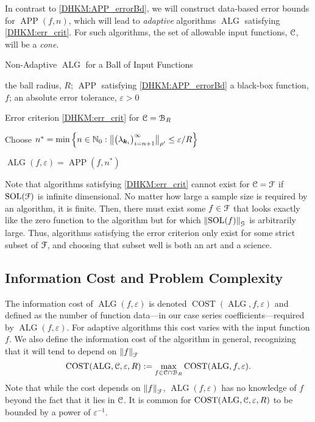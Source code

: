 \documentclass[USenglish]{article}
\DeclareMathOperator{\SOL}{SOL}
\DeclareMathOperator{\APP}{APP}
\DeclareMathOperator{\ALG}{ALG}
\DeclareMathOperator{\COST}{COST}
\newcommand{\norm}[2][{}]{\ensuremath{\left \lVert #2 \right \rVert}_{#1}}
\newcommand{\bignorm}[2][{}]{\ensuremath{\bigl \lVert #2 \bigr \rVert}_{#1}}
\begin{document}
In contrast to \eqref{DHKM:APP_errorBd}, we will construct data-based error bounds for $\APP(f,n)$, which will lead to \emph{adaptive} algorithms $\ALG$ satisfying \eqref{DHKM:err_crit}.  For such algorithms, the set of allowable input functions, ${\mathcal{C}}$, will be a \emph{cone}.

\begin{algorithm}
	\caption{Non-Adaptive $\ALG$ for a Ball of Input Functions} \label{DHKM:BallAlg}
	\begin{algorithmic}
	\PARAM the ball radius, $R$; $\APP$ satisfying \eqref{DHKM:APP_errorBd}
	\INPUT a black-box function, $f$; an absolute error tolerance, $\varepsilon>0$

    \Ensure Error criterion \eqref{DHKM:err_crit} for ${\mathcal{C}} = {\mathcal{B}}_{R}$

    \State Choose $n^* =  \min \left \{n \in \N_0 : \bignorm[\rho']{\bigl(  \lambda_{\bsk_i}  \bigr)_{i = n+1}^{\infty}} \le \varepsilon /R \right \}$

    \RETURN $\ALG(f,\varepsilon) = \APP(f,n^*)$
\end{algorithmic}
\end{algorithm}

Note that algorithms satisfying \eqref{DHKM:err_crit} cannot exist for ${\mathcal{C}} = {\mathcal{F}}$ if $\SOL(\calF)$ is infinite dimensional. No matter how large a sample size is required by an algorithm, it is finite.  Then, there must exist some $f \in {\mathcal{F}}$ that looks exactly like the zero function to the algorithm but for which $\norm[\calG]{\SOL(f)}$ is arbitrarily large.  Thus, algorithms satisfying the error criterion only exist for some strict subset of ${\mathcal{F}}$, and choosing that subset well is both an art and a science.


\subsection{Information Cost and Problem Complexity}

The information cost of $\ALG(f,\varepsilon)$ is denoted $\COST(\ALG,f,\varepsilon)$ and defined as the number of function data---in our case series coefficients---required by $\ALG(f,\varepsilon)$.  For adaptive algorithms this cost varies with the input function $f$.  We also define the information cost of the algorithm in general, recognizing that it will tend to depend on $\norm[\calF]{f}$
\begin{equation*}
    \COST(\ALG, \calC, \varepsilon,R) : = \max_{f \in \calC \cap \calB_{R}} \COST(\ALG,f,\varepsilon).
\end{equation*}
Note that while the cost depends on $\norm[\calF]{f}$, $\ALG(f,\varepsilon)$ has no knowledge of $f$ beyond the fact that it lies in ${\mathcal{C}}$.  It is common for $\COST(\ALG, \calC, \varepsilon,R)$ to be bounded by a power of $\varepsilon^{-1}$.
\end{document}
